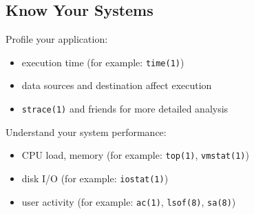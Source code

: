 \documentclass[xga]{xdvislides}
\begin{document}

\subsection{Know Your Systems}
Profile your application:
\begin{itemize}
	\item execution time (for example: {\tt time(1)})
	\item data sources and destination affect execution
	\item {\tt strace(1)} and friends for more detailed analysis
\end{itemize}

\addvspace{.5in}
Understand your system performance:
\begin{itemize}
	\item CPU load, memory (for example: {\tt top(1)}, {\tt vmstat(1)})
	\item disk I/O (for example: {\tt iostat(1)})
	\item user activity (for example: {\tt ac(1)}, {\tt lsof(8)}, {\tt sa(8)})
\end{itemize}
\end{document}
